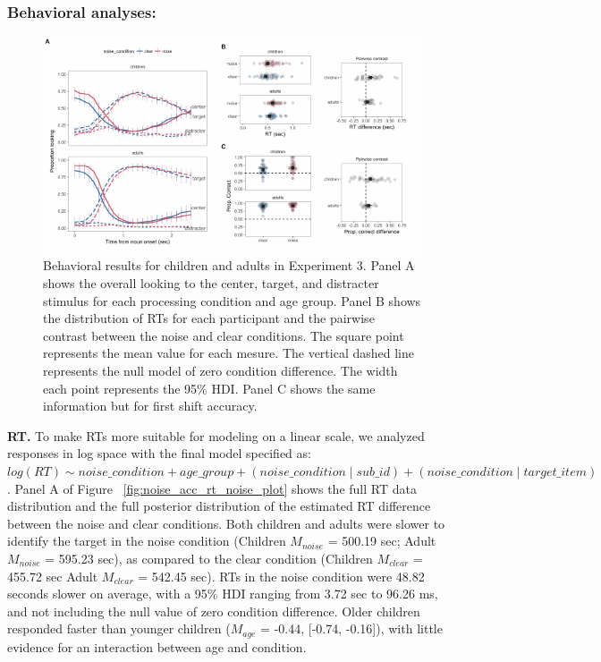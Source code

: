 \documentclass[english,floatsintext,man]{apa6}
\begin{document}
\hypertarget{behavioral-analyses-2}{%
\subsubsection{Behavioral analyses:}\label{behavioral-analyses-2}}

\begin{figure}[!ht]

{\centering \includegraphics[width=0.85\linewidth]{figs/noise-acc-rt-1} 

}

\caption{Behavioral results for children and adults in Experiment 3. Panel A shows the overall looking to the center, target, and distracter stimulus for each processing condition and age group. Panel B shows the distribution of RTs for each participant and the pairwise contrast between the noise and clear conditions. The square point represents the mean value for each mesure. The vertical dashed line represents the null model of zero condition difference. The width each point represents the 95\% HDI. Panel C shows the same information but for first shift accuracy.}\label{fig:noise-acc-rt}
\end{figure}

\textbf{RT.} To make RTs more suitable for modeling on a linear scale,
we analyzed responses in log space with the final model specified as:
\texttt{$log(RT) \sim noise\_condition + age\_group + (noise\_condition \mid sub\_id ) + (noise\_condition \mid target\_item)$}.
Panel A of Figure ~\ref{fig:noise_acc_rt_noise_plot} shows the full RT
data distribution and the full posterior distribution of the estimated
RT difference between the noise and clear conditions. Both children and
adults were slower to identify the target in the noise condition
(Children \(M_{noise}\) = 500.19 sec; Adult \(M_{noise}\) = 595.23 sec),
as compared to the clear condition (Children \(M_{clear}\) = 455.72 sec
Adult \(M_{clear}\) = 542.45 sec). RTs in the noise condition were 48.82
seconds slower on average, with a 95\% HDI ranging from 3.72 sec to
96.26 ms, and not including the null value of zero condition difference.
Older children responded faster than younger children (\(M_{age}\) =
-0.44, {[}-0.74, -0.16{]}), with little evidence for an interaction
between age and condition.
\end{document}
